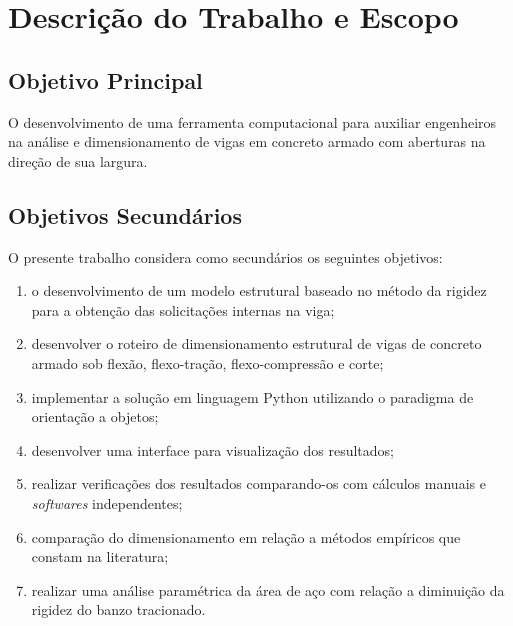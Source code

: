 %
%
%
%
\chapter{Descrição do Trabalho e Escopo}

\section{Objetivo Principal}

O desenvolvimento de uma ferramenta computacional para auxiliar engenheiros na análise e
dimensionamento de vigas em concreto armado com aberturas na direção de sua largura.

\section{Objetivos Secundários}

O presente trabalho considera como secundários os seguintes objetivos:

\begin{enumerate}[label= \alph*)]

    \item o desenvolvimento de um modelo estrutural baseado no método da rigidez para a obtenção das solicitações internas na viga;

    \item desenvolver o roteiro de dimensionamento estrutural de vigas de concreto armado sob flexão, flexo-tração,     flexo-compressão e corte;

    \item implementar a solução em linguagem Python utilizando o paradigma de orientação a objetos;

    \item desenvolver uma interface para visualização dos resultados;

    \item realizar verificações dos resultados comparando-os com cálculos manuais e \textit{softwares} independentes;

    \item comparação do dimensionamento em relação a métodos empíricos que constam na literatura;

    \item realizar uma análise paramétrica da área de aço com relação a diminuição da rigidez do banzo tracionado.

\end{enumerate}

